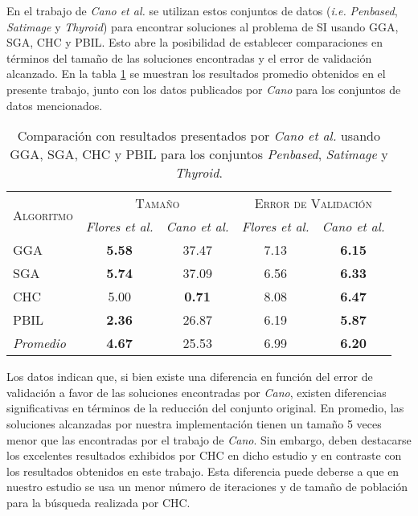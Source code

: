 En el trabajo de \emph{Cano et al.} \cite{cano2003using} se utilizan estos conjuntos de datos (\emph{i.e.} \emph{Penbased}, \emph{Satimage} y \emph{Thyroid}) para encontrar soluciones al problema de SI usando GGA, SGA, CHC y PBIL. Esto abre la posibilidad de establecer comparaciones en términos del tamaño de las soluciones encontradas y el error de validación alcanzado. En la tabla \ref{res-big-cano} se muestran los resultados promedio obtenidos en el presente trabajo, junto con los datos publicados por \emph{Cano} para los conjuntos de datos mencionados.

\begin{table}[h!]
\centering
\begin{tabular}{l c c c c}
\hline
\multirow{2}{*}{\textsc{Algoritmo}}
	& \multicolumn{2}{c}{\textsc{\hspace*{30pt}Tamaño\hspace*{30pt}}}
	& \multicolumn{2}{c}{\textsc{Error de Validación}} \\\cline{2-5}
 & \scriptsize{\emph{Flores et al.}} & \scriptsize{\emph{Cano et al.}}
 	& \scriptsize{\emph{Flores et al.}} & \scriptsize{\emph{Cano et al.}} \\
\hline
\hline
GGA  & \textbf{5.58} & 37.47 & 7.13 & \textbf{6.15} \\
SGA  & \textbf{5.74} & 37.09 & 6.56 & \textbf{6.33} \\
CHC  & 5.00 &  \textbf{0.71} & 8.08 & \textbf{6.47} \\
PBIL & \textbf{2.36} & 26.87 & 6.19 & \textbf{5.87} \\
\hline
\emph{Promedio} & \textbf{4.67} & 25.53 & 6.99 & \textbf{6.20} \\
\hline
\end{tabular}
\caption[Comparación con resultados presentados por \emph{Cano et al.}]{Comparación con resultados presentados por \emph{Cano et al.} usando GGA, SGA, CHC y PBIL para los conjuntos \emph{Penbased}, \emph{Satimage} y \emph{Thyroid}.}
\label{res-big-cano}
\end{table}

Los datos indican que, si bien existe una diferencia en función del error de validación  a favor de las soluciones encontradas por \emph{Cano}, existen diferencias significativas en términos de la reducción del conjunto original. En promedio, las soluciones alcanzadas por nuestra implementación tienen un tamaño 5 veces menor que las encontradas por el trabajo de \emph{Cano}. Sin embargo, deben destacarse los excelentes resultados exhibidos por CHC en dicho estudio y en contraste con los resultados obtenidos en este trabajo. Esta diferencia puede deberse a que en nuestro estudio se usa un menor número de iteraciones y de tamaño de población para la búsqueda realizada por CHC.

